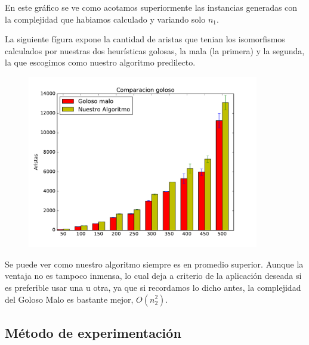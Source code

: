 En este gráfico se ve como acotamos superiormente las instancias generadas con la complejidad que habiamos calculado y variando solo $n_1$.

La siguiente fígura expone la cantidad de aristas que tenian los isomorfismos calculados por nuestras dos heurísticas golosas, la mala (la primera) y la segunda, la que escogimos como nuestro algoritmo predilecto.

\begin{figure}[H]
 \centering
	\includegraphics[width=0.9\textwidth]{graficos/problema_4/calidad.pdf}
	\caption{}
	\label{fig:problema4-4}
\end{figure}

Se puede ver como nuestro algoritmo siempre es en promedio superior. Aunque la ventaja no es tampoco inmensa, lo cual deja a criterio de la aplicación deseada si es preferible usar una u otra, ya que si recordamos lo dicho antes, la complejidad del Goloso Malo es bastante mejor, $O(n_2^2)$.

\subsection{Método de experimentación}